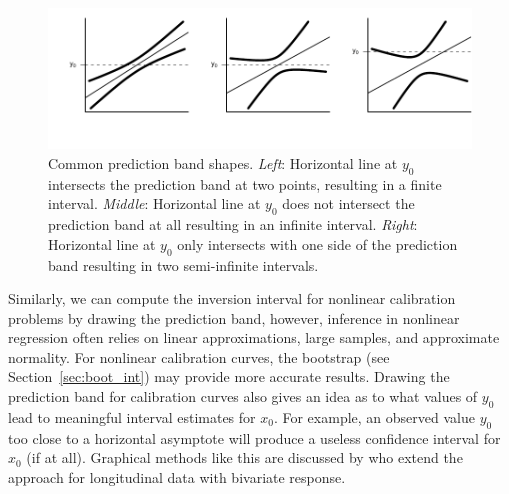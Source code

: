 \documentclass[cmfont,usenames,dvipsnames,leqno]{afit-etd}\usepackage[]{graphicx}\usepackage[]{color}
\makeatletter
\def\maxwidth{ %
  \ifdim\Gin@nat@width>\linewidth
    \linewidth
  \else
    \Gin@nat@width
  \fi
}
\newenvironment{knitrout}{}{} %
\renewenvironment{knitrout}{\begin{singlespace}}{\end{singlespace}}
\makeatother
\begin{document}
\begin{knitrout}
\color{fgcolor}\begin{figure}[H]

\includegraphics[width=\maxwidth]{figure/bands} \caption[Common prediction band shapes]{Common prediction band shapes. \textit{Left}: Horizontal line at $y_0$ intersects the prediction band at two points, resulting in a finite interval. \textit{Middle}: Horizontal line at $y_0$ does not intersect the prediction band at all resulting in an infinite interval. \textit{Right}: Horizontal line at $y_0$ only intersects with one side of the prediction band resulting in two semi-infinite intervals.\label{fig:bands}}
\end{figure}


\end{knitrout}


Similarly, we can compute the inversion interval for nonlinear calibration problems by drawing the prediction band, however, inference in nonlinear regression often relies on linear approximations, large samples, and approximate normality. For nonlinear calibration curves, the bootstrap (see Section~\ref{sec:boot_int}) may provide more accurate results. Drawing the prediction band for calibration curves also gives an idea as to what values of $y_0$ lead to meaningful interval estimates for $x_0$. For example, an observed value $y_0$ too close to a horizontal asymptote will produce a useless confidence interval for $x_0$ (if at all). Graphical methods like this are discussed by \citet{jones_approximate_2009} who extend the approach for longitudinal data with bivariate response.

\end{document}
